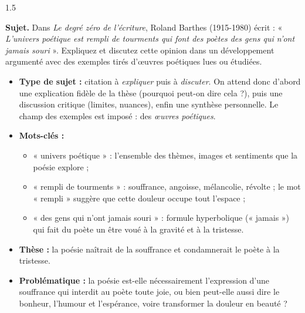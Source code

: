 \documentclass[12pt]{article}
\begin{document}
\begin{spacing}{1.5}

\noindent\textbf{Sujet.} Dans \emph{Le degré zéro de l'écriture}, Roland Barthes (1915-1980) écrit : « \emph{L'univers poétique est rempli de tourments qui font des poètes des gens qui n'ont jamais souri} ». Expliquez et discutez cette opinion dans un développement argumenté avec des exemples tirés d'œuvres poétiques lues ou étudiées.


\begin{itemize}
\item \textbf{Type de sujet :} citation à \emph{expliquer} puis à \emph{discuter}. On attend donc d'abord une explication fidèle de la thèse (pourquoi peut-on dire cela ?), puis une discussion critique (limites, nuances), enfin une synthèse personnelle. Le champ des exemples est imposé : des \emph{œuvres poétiques}.
\item \textbf{Mots-clés :}
  \begin{itemize}
  \item « univers poétique » : l'ensemble des thèmes, images et sentiments que la poésie explore ;
  \item « rempli de tourments » : souffrance, angoisse, mélancolie, révolte ; le mot « rempli » suggère que cette douleur occupe tout l'espace ;
  \item « des gens qui n'ont jamais souri » : formule hyperbolique (« jamais ») qui fait du poète un être voué à la gravité et à la tristesse.
  \end{itemize}
\item \textbf{Thèse :} la poésie naîtrait de la souffrance et condamnerait le poète à la tristesse.
\item \textbf{Problématique :} la poésie est-elle nécessairement l'expression d'une souffrance qui interdit au poète toute joie, ou bien peut-elle aussi dire le bonheur, l'humour et l'espérance, voire transformer la douleur en beauté ?
\end{itemize}



\end{spacing}
\end{document}
